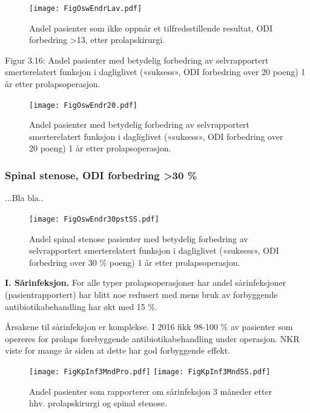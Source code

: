 \documentclass [norsk,a4paper,twoside]{article}\usepackage[]{graphicx}\usepackage[]{color}
\begin{document}
\begin{figure}[ht]
	\centering \texttt{[image: FigOswEndrLav.pdf]}
	\caption{\label{fig:OswEndrLav}   Andel pasienter som ikke oppnår et tilfredsstillende resultat, ODI
forbedring >13, etter prolapskirurgi.}
\end{figure}



Figur 3.16: Andel pasienter med betydelig forbedring av selvrapportert
smerterelatert funksjon i dagliglivet («suksess», ODI forbedring over 20 poeng) 1 år
etter prolapsoperasjon.
\begin{figure}[ht]
	\centering \texttt{[image: FigOswEndr20.pdf]}
	\caption{\label{fig:OswEndr20}   Andel pasienter med betydelig forbedring av selvrapportert
smerterelatert funksjon i dagliglivet («suksess», ODI forbedring over 20 poeng) 1 år
etter prolapsoperasjon.}
\end{figure}

\subsubsection{Spinal stenose, ODI forbedring >30 \%}

...Bla bla..

\begin{figure}[ht]
	\centering \texttt{[image: FigOswEndr30pstSS.pdf]}
	\caption{\label{fig:OswEndr30pstSS} Andel spinal stenose pasienter med betydelig forbedring av selvrapportert
smerterelatert funksjon i dagliglivet («suksess», ODI forbedring over 30 \% poeng) 1 år
etter prolapsoperasjon.}
\end{figure}




\textbf{I. Sårinfeksjon.}
For alle typer prolapsoperasjoner har
andel sårinfeksjoner (pasientrapportert) har blitt noe redusert med mens
bruk av forbyggende antibiotikabehandling har økt med 15 \%. 

Årsakene til sårinfeksjon er komplekse. I 2016 fikk 98-100 \% av pasienter som
opereres for prolaps forebyggende antibiotikabehandling under operasjon. NKR
viste for mange år siden at dette har god forbyggende effekt.

\begin{figure}[ht]
	\centering \texttt{[image: FigKpInf3MndPro.pdf]}
	\centering \texttt{[image: FigKpInf3MndSS.pdf]}
	\caption{\label{fig:KpInf} Andel pasienter som rapporterer om sårinfeksjon 3 måneder etter
hhv. prolapskirurgi og spinal stenose.}
\end{figure}
\end{document}
